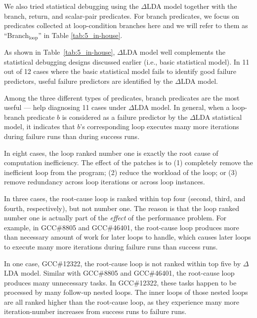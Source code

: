 



We also tried statistical debugging using the $\Delta$LDA model
together with the branch, return, and scalar-pair predicates. 
For branch predicates, we focus on predicates collected
at loop-condition branches here and we will refer to them as 
``Branch$_{\text{loop}}$'' in 
Table \ref{tab:5_in-house}.

As shown in Table~\ref{tab:5_in-house},
$\Delta$LDA model well complements the statistical debugging 
designs discussed earlier
(i.e., basic statistical model).
In 11 out of 12 cases where the basic statistical model fails to identify
good failure predictors, useful failure predictors are identified by
the $\Delta$LDA model.

Among the three different types of predicates, branch predicates are the
most useful --- help diagnosing 11 cases under $\Delta$LDA model. 
In general, when a loop-branch predicate $b$ is considered as a failure
predictor by the $\Delta$LDA statistical model, it indicates that $b$'s
corresponding loop executes many more iterations
during failure runs than during success runs.



In eight cases, the loop ranked number one is exactly the root cause of 
computation inefficiency. The effect of the patches is to
(1) completely remove the
inefficient loop from the program; %
(2) reduce the workload of the loop; %
or
(3) remove redundancy
across loop iterations or across loop instances.

In three cases, the root-cause loop is ranked within top four (second, third, 
and fourth, respectively), but not number one. The reason is that the loop
ranked number one is actually part of the \textit{effect} of the performance
problem. For example, in GCC\#8805 and GCC\#46401, the root-cause loop
produces more than necessary amount of work for later loops to handle, which
causes later loops to execute many more iterations during failure runs
than success runs.

In one case, GCC\#12322, the root-cause loop is not ranked within top five
by $\Delta$LDA model. Similar with GCC\#8805 and GCC\#46401, the root-cause
loop produces many unnecessary tasks. In GCC\#12322, these tasks 
happen to be processed by many follow-up
nested loops. The inner loops of those nested loops are all ranked higher
than the root-cause loop, %
as they experience many more iteration-number 
increases from success runs to failure runs. 

